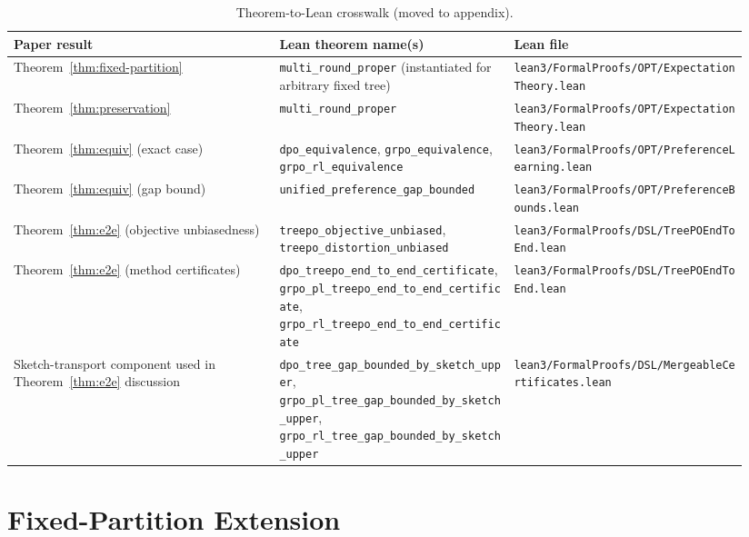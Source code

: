 \documentclass[11pt]{article}
\begin{document}
\begin{table}[h]
\centering
\small
\begin{tabular}{p{0.34\linewidth}p{0.30\linewidth}p{0.30\linewidth}}
\toprule
Paper result & Lean theorem name(s) & Lean file \\
\midrule
Theorem~\ref{thm:fixed-partition} &
\texttt{multi\_round\_proper} (instantiated for arbitrary fixed tree) &
\texttt{lean3/FormalProofs/OPT/ExpectationTheory.lean} \\

Theorem~\ref{thm:preservation} &
\texttt{multi\_round\_proper} &
\texttt{lean3/FormalProofs/OPT/ExpectationTheory.lean} \\

Theorem~\ref{thm:equiv} (exact case) &
\texttt{dpo\_equivalence}, \texttt{grpo\_equivalence}, \texttt{grpo\_rl\_equivalence} &
\texttt{lean3/FormalProofs/OPT/PreferenceLearning.lean} \\

Theorem~\ref{thm:equiv} (gap bound) &
\texttt{unified\_preference\_gap\_bounded} &
\texttt{lean3/FormalProofs/OPT/PreferenceBounds.lean} \\

Theorem~\ref{thm:e2e} (objective unbiasedness) &
\texttt{treepo\_objective\_unbiased}, \texttt{treepo\_distortion\_unbiased} &
\texttt{lean3/FormalProofs/DSL/TreePOEndToEnd.lean} \\

Theorem~\ref{thm:e2e} (method certificates) &
\texttt{dpo\_treepo\_end\_to\_end\_certificate}, \texttt{grpo\_pl\_treepo\_end\_to\_end\_certificate}, \texttt{grpo\_rl\_treepo\_end\_to\_end\_certificate} &
\texttt{lean3/FormalProofs/DSL/TreePOEndToEnd.lean} \\

Sketch-transport component used in Theorem~\ref{thm:e2e} discussion &
\texttt{dpo\_tree\_gap\_bounded\_by\_sketch\_upper}, \texttt{grpo\_pl\_tree\_gap\_bounded\_by\_sketch\_upper}, \texttt{grpo\_rl\_tree\_gap\_bounded\_by\_sketch\_upper} &
\texttt{lean3/FormalProofs/DSL/MergeableCertificates.lean} \\
\bottomrule
\end{tabular}
\caption{Theorem-to-Lean crosswalk (moved to appendix).}
\end{table}

\section{Fixed-Partition Extension}\label{app:fixed-partition}
\end{document}
